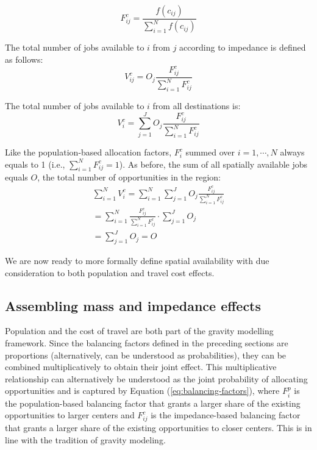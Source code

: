 \documentclass[10pt,letterpaper]{article}
\begin{document}
\begin{equation}
\label{eq:impedance-balancing-factor}
F^c_{ij} = \frac{f(c_{ij})}{\sum_{i=1}^N f(c_{ij})}
\end{equation}

The total number of jobs available to \(i\) from \(j\) according to
impedance is defined as follows: \[
V^c_{ij} = O_j\frac{F^c_{ij}}{\sum_{i=1}^N F^c_{ij}}
\]

The total number of jobs available to \(i\) from all destinations is: \[
V^c_{i} = \sum_{j=1}^J O_j\frac{F^c_{ij}}{\sum_{i=1}^N F^c_{ij}}
\]

Like the population-based allocation factors, \(F^c_{i}\) summed over
\(i=1,\cdots,N\) always equals to 1 (i.e.,
\(\sum_{i=1}^{N} F^c_{ij} = 1\)). As before, the sum of all spatially
available jobs equals \(O\), the total number of opportunities in the
region: \[
\begin{array}{l}
\sum_{i=1}^N V^c_i =\sum_{i=1}^N\sum_{j=1}^JO_j\frac{F^c_{ij}}{\sum_{i=1}^N F^c_{ij}}\\
=\sum_{i=1}^N \frac{F^c_{ij}}{\sum_{i=1}^N F^c_{ij}}\cdot\sum_{j=1}^JO_j\\
=\sum_{j=1}^J O_j = O
\end{array}
\]

We are now ready to more formally define spatial availability with due
consideration to both population and travel cost effects.

\hypertarget{assembling-mass-and-impedance-effects}{%
\subsection{Assembling mass and impedance
effects}\label{assembling-mass-and-impedance-effects}}

Population and the cost of travel are both part of the gravity modelling
framework. Since the balancing factors defined in the preceding sections
are proportions (alternatively, can be understood as probabilities),
they can be combined multiplicatively to obtain their joint effect. This
multiplicative relationship can alternatively be understood as the joint
probability of allocating opportunities and is captured by Equation
(\ref{eq:balancing-factors}), where \(F^p_{i}\) is the population-based
balancing factor that grants a larger share of the existing
opportunities to larger centers and \(F^c_{ij}\) is the impedance-based
balancing factor that grants a larger share of the existing
opportunities to closer centers. This is in line with the tradition of
gravity modeling.
\end{document}
